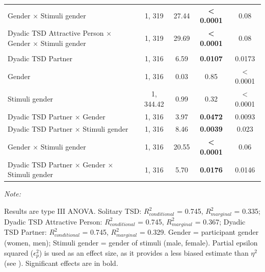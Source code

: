 \documentclass[
  bookmarksnumbered]{article}
\begin{document}
\begin{table}[H]
{\begin{threeparttable}
\begin{tabular}[t]{lcccc}
\hspace{1em}Gender × Stimuli gender & 1, 319 & 27.44 & \textbf{< 0.0001} & 0.08\\
\hspace{1em}Dyadic TSD Attractive Person × Gender × Stimuli gender & 1, 319 & 29.69 & \textbf{< 0.0001} & 0.08\\
\addlinespace[0.3em]
\multicolumn{5}{l}{\cellcolor{lightgray}{Dyadic TSD Partner}}\\
\hspace{1em}Dyadic TSD Partner & 1, 316 & 6.59 & \textbf{0.0107} & 0.0173\\
\hspace{1em}Gender & 1, 316 & 0.03 & 0.85 & < 0.0001\\
\hspace{1em}Stimuli gender & 1, 344.42 & 0.99 & 0.32 & < 0.0001\\
\hspace{1em}Dyadic TSD Partner × Gender & 1, 316 & 3.97 & \textbf{0.0472} & 0.0093\\
\hspace{1em}Dyadic TSD Partner × Stimuli gender & 1, 316 & 8.46 & \textbf{0.0039} & 0.023\\
\hspace{1em}Gender × Stimuli gender & 1, 316 & 20.55 & \textbf{< 0.0001} & 0.06\\
\hspace{1em}Dyadic TSD Partner × Gender × Stimuli gender & 1, 316 & 5.70 & \textbf{0.0176} & 0.0146\\
\bottomrule
\end{tabular}
\begin{tablenotes}[para]
\item \textit{Note: } 
\item Results are type III ANOVA. Solitary TSD: $R^2_{conditional}$ = 0.745, $R^2_{marginal}$ = 0.335; Dyadic TSD Attractive Person: $R^2_{conditional}$ = 0.745, $R^2_{marginal}$ = 0.367; Dyadic TSD Partner: $R^2_{conditional}$ = 0.745, $R^2_{marginal}$ = 0.329. Gender = participant gender (women, men); Stimuli gender = gender of stimuli (male, female).
      Partial epsilon squared ($\epsilon^2_p$) is used as an effect size, as it provides
      a less biased estimate than $\eta^2$ (see \cite{albersWhenPowerAnalyses2018}).
      Significant effects are in bold.
\end{tablenotes}
\end{threeparttable}}
\end{table}
\end{document}
